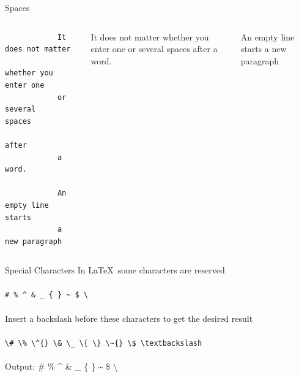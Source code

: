 \documentclass[table]{beamer}
\newcommand{\latex}{\LaTeX\ }
\begin{document}
\begin{frame}[fragile]{Spaces}
    \begin{columns}
        \begin{verbatim}
            It does not matter
            whether you enter one
            or several     spaces
            after
            a    word.

            An empty line starts
            a new paragraph
        \end{verbatim}
            It does not matter
            whether you enter one
            or several     spaces
            after
            a    word.

            An empty line starts
            a new paragraph
    \end{columns}
\end{frame}


\begin{frame}[fragile]{Special Characters}
    In \latex some characters are reserved\\
    \\
    \verb|# % ^ & _ { } ~ $ \ |\\
    \\
    Insert a backslash before these characters to get the desired result\\
    \\
    \verb|\# \% \^{} \& \_ \{ \} \~{} \$ \textbackslash|\\
    \\
    Output: \# \% \^{} \& \_ \{ \} \~{} \$ \textbackslash
\end{frame}
\end{document}
